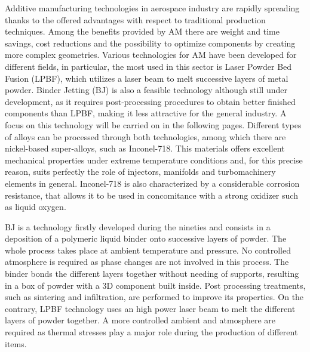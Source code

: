 Additive manufacturing technologies in aerospace industry are rapidly spreading thanks to the offered advantages with respect to traditional production techniques. Among the benefits provided by AM there are weight and time savings, cost reductions and  the possibility to optimize components by creating more complex geometries\cite{materials_and_desing}.
Various technologies for AM have been developed for different fields, in particular, the most used in this sector is Laser Powder Bed Fusion (LPBF), which utilizes a laser beam to melt successive layers of metal powder. Binder Jetting (BJ) is also a feasible technology although still under development, as it requires post-processing procedures to obtain better finished components than LPBF, making it less attractive for the general industry. A focus on this technology will be carried on in the following pages. Different types of alloys can be processed through both technologies, among which there are nickel-based super-alloys, such as Inconel-718. This materials offers excellent mechanical properties under extreme temperature conditions and, for this precise reason, suits perfectly the role of injectors, manifolds and turbomachinery elements in general. Inconel-718 is also characterized by a considerable corrosion resistance, that allows it to be used in concomitance with a strong oxidizer such as liquid oxygen\cite{Inconel_vs_steel}.

BJ is a technology firstly developed during the nineties and consists in a deposition of a polymeric liquid binder onto successive layers of powder. The whole process takes place at ambient temperature and pressure. No controlled atmosphere is required as phase changes are not involved in this process. The binder bonds the different layers together without needing of supports, resulting in a box of powder with a 3D component built inside. Post processing treatments, such as sintering and infiltration, are performed to improve its properties\cite{bj_inconel}. On the contrary, LPBF technology uses an high power laser beam to melt the different layers of powder together. A more controlled ambient and atmosphere are required as thermal stresses play a major role during the production of different items\cite{materials_and_desing}.

